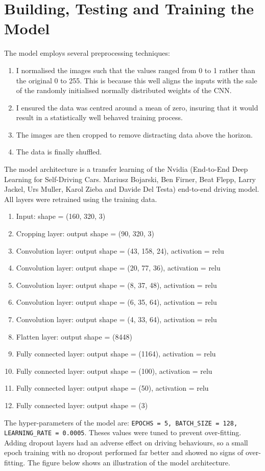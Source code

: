 \documentclass[letterpaper,12pt]{article}
\begin{document}
\section{Building, Testing and Training the Model}
The model employs several preprocessing techniques:
\begin{enumerate}
\item I normalised the images such that the values ranged from 0 to 1 rather than the original 0 to 255. This is because this well aligns the inputs with the sale of the randomly initialised normally distributed weights of the CNN.
\item I ensured the data was centred around a mean of zero, insuring that it would result in a statistically well behaved training process.
\item The images are then cropped to remove distracting data above the horizon.
\item The data is finally shuffled.
\end{enumerate}
The model architecture is a transfer learning of the Nvidia (End-to-End Deep Learning for Self-Driving Cars. Mariusz Bojarski, Ben Firner, Beat Flepp, Larry Jackel, Urs Muller, Karol Zieba and Davide Del Testa)  end-to-end driving model. All layers were retrained using the training data.
\begin{enumerate}
\item Input: shape = (160, 320, 3)
\item Cropping layer: output shape = (90, 320, 3)
\item Convolution layer:  output shape = (43, 158, 24), activation = relu
\item Convolution layer:  output shape = (20, 77, 36), activation = relu
\item Convolution layer:  output shape = (8, 37, 48), activation = relu
\item Convolution layer:  output shape = (6, 35, 64), activation = relu
\item Convolution layer:  output shape = (4, 33, 64), activation = relu
\item Flatten layer: output shape = (8448)
\item Fully connected layer: output shape = (1164), activation = relu
\item Fully connected layer: output shape = (100), activation = relu
\item Fully connected layer: output shape = (50), activation = relu
\item Fully connected layer: output shape = (3)
\end{enumerate}
The hyper-parameters of the model are: \texttt{EPOCHS = 5, BATCH\_SIZE = 128, LEARNING\_RATE = 0.0005}. Theses values were tuned to prevent over-fitting. Adding dropout layers had an adverse effect on driving behaviours, so a small epoch training with no dropout performed far better and showed no signs of over-fitting. The figure below shows an illustration of the model architecture. 
\end{document}
